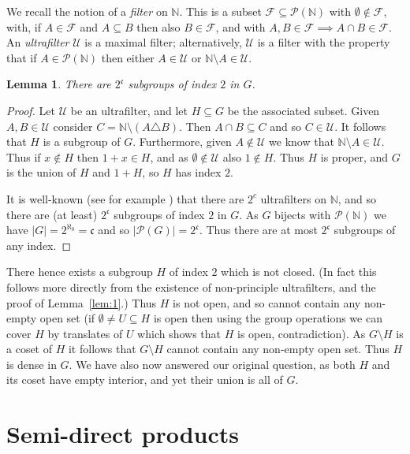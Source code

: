 \documentclass[twoside,a4paper,12pt]{article}
\theoremstyle{plain}
\newtheorem{lemma}[proposition]{Lemma}
\theoremstyle{definition}
\newcommand{\mc}{\mathcal}
\newcommand{\mf}{\mathfrak}
\begin{document}
We recall the notion of a \emph{filter} on $\mathbb N$.  This is a subset $\mc F\subseteq
\mc P(\mathbb N)$ with $\emptyset\not\in\mc F$, with, if $A\in\mc F$ and $A\subseteq B$ then also
$B\in\mc F$, and with $A,B\in\mc F\implies A\cap B\in\mc F$.  An \emph{ultrafilter} $\mc U$
is a maximal filter; alternatively, $\mc U$ is a filter with the property that if
$A\in\mc P(\mathbb N)$ then either $A\in\mc U$ or $\mathbb N\setminus A\in\mc U$.

\begin{lemma}
There are $2^{\mf{c}}$ subgroups of index $2$ in $G$.
\end{lemma}
\begin{proof}
Let $\mc U$ be an ultrafilter, and let $H\subseteq G$ be the associated subset.  Given $A,B\in\mc U$
consider $C=\mathbb N \setminus (A\triangle B)$.  Then $A\cap B \subseteq C$ and so $C\in\mc U$.
It follows that $H$ is a subgroup of $G$.  Furthermore, given $A\not\in\mc U$ we know that
$\mathbb N\setminus A\in\mc U$.  Thus if $x\not\in H$ then $1+x\in H$, and as $\emptyset\not\in
\mc U$ also $1\not\in H$.  Thus $H$ is proper, and $G$ is the union of $H$ and $1+H$, so $H$ has
index $2$.

It is well-known (see for example \cite{a2}) that there are $2^c$ ultrafilters on $\mathbb N$,
and so there are (at least) $2^\mf{c}$ subgroups of index $2$ in $G$.  As $G$ bijects with
$\mc P(\mathbb N)$ we have $|G| = 2^{\aleph_0} = \mf{c}$ and so $|\mc P(G)| = 2^{\mf{c}}$.
Thus there are at most $2^{\mf{c}}$ subgroups of any index.
\end{proof}

There hence exists a subgroup $H$ of index $2$ which is not closed.  (In fact this follows more
directly from the existence of non-principle ultrafilters, and the proof of Lemma~\ref{lem:1}.)
Thus $H$ is not open, and so cannot contain any non-empty open set (if $\emptyset\not=
U\subseteq H$ is open then using the group operations we can cover $H$ by translates of $U$ which
shows that $H$ is open, contradiction).  As $G\setminus H$ is a coset of $H$ it follows that
$G\setminus H$ cannot contain any non-empty open set.  Thus $H$ is dense in $G$.  We have also
now answered our original question, as both $H$ and its coset have empty interior, and yet their
union is all of $G$.





\clearpage

\section{Semi-direct products}
\end{document}

